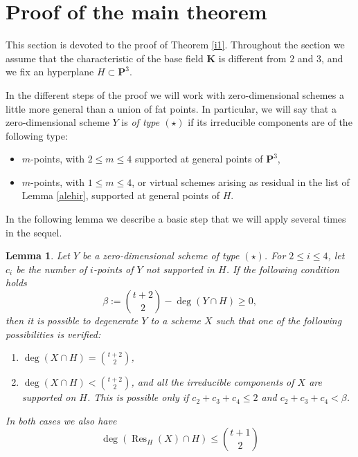 \documentclass{amsart}
\theoremstyle{plain}
\newtheorem{lemma}[theorem]{Lemma}
\theoremstyle{definition}
\begin{document}
\section{Proof of the main theorem}

This section is devoted to the proof of Theorem \ref{i1}.
Throughout the section we assume that the characteristic of the base
field $\mathbf{K}$ is different from $2$ and $3$, and we fix an
hyperplane $H\subset{\mathbf P}^3$.

In the different steps of the proof we will work with zero-dimensional
schemes a little more general than a union of fat points. In
particular, we will say that a zero-dimensional
scheme $Y$ is {\em of type $(\star)$} if its irreducible components
are of the following type:
\begin{itemize}
\item[-]
$m$-points, with $2\le m\le4$ supported at general points of ${\mathbf P}^3$,
\item[-]
$m$-points, with $1\le m\le 4$, or virtual schemes arising as residual
in the list of Lemma
\ref{alehir}, supported at general points of $H$.
\end{itemize}

In the following lemma we describe a basic step that we will apply
several times in the sequel.

\begin{lemma}\label{lemma-a}
Let $Y$ be a zero-dimensional scheme of type $(\star)$.
For $2\le i \le 4$, let $c_i$ be the number of $i$-points of $Y$ not
supported in $H$.
If the following condition holds
\begin{equation}\label{condizione}
\beta:=\binom{t+2}{2}-\deg(Y\cap H)\geq0,
\end{equation}
then it is possible to degenerate $Y$ to a scheme $X$ such that
one of the following possibilities is verified:
\begin{enumerate}
\item[(I)] $\deg(X \cap H)=\binom{t+2}{2}$,
\item[(II)] $\deg(X \cap H)<\binom{t+2}{2}$, and all the irreducible
  components of $X$ are supported on $H$. This is possible only if
  $c_2+c_3+c_4\le2$ and $c_2+c_3+c_4<\beta$.
\end{enumerate}
In both cases we also have
\begin{equation}\label{caldo}
\deg(\operatorname{Res}_H(X)\cap H)\le \binom{t+1}{2}
\end{equation}
\end{lemma}
\end{document}
